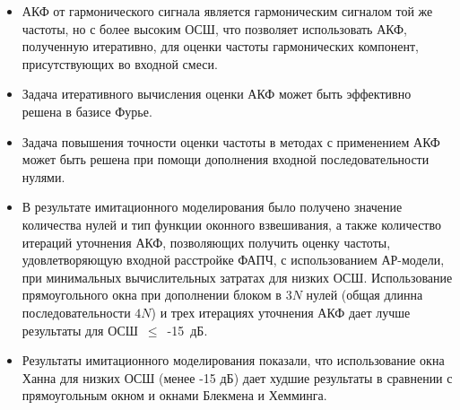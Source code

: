 \begin{itemize}
\item АКФ от гармонического сигнала является гармоническим сигналом той же частоты, но с более высоким ОСШ, что позволяет использовать АКФ, полученную итеративно,
	для оценки частоты гармонических компонент, присутствующих во входной смеси.

\item Задача итеративного вычисления оценки АКФ может быть эффективно решена в базисе Фурье.

\item Задача повышения точности оценки частоты в методах с применением АКФ может быть решена при помощи дополнения входной последовательности нулями.

\item В результате имитационного моделирования было получено значение количества нулей и тип функции оконного взвешивания, а также количество итераций уточнения АКФ,
	позволяющих получить оценку частоты, удовлетворяющую входной расстройке ФАПЧ, с использованием АР-модели, при минимальных вычислительных затратах для низких ОСШ.
	Использование прямоугольного окна при дополнении блоком в ${3N}$ нулей (общая длинна последовательности ${4N}$) и трех итерациях уточнения АКФ дает лучше результаты
	для  \mbox{ОСШ ${\le}$ -15 дБ.}

\item Результаты имитационного моделирования показали, что использование окна Ханна для низких ОСШ (менее -15 дБ) дает худшие результаты в сравнении с прямоугольным
	окном и окнами Блекмена и Хемминга.

\end{itemize}

\clearpage
{}			%

\clearpage
